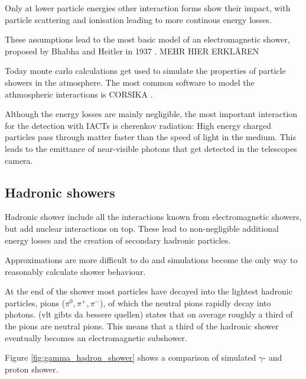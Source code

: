 Only at lower particle energies other interaction forms show their impact,
with particle scattering and ionisation 
leading to more continous energy losses.

These assumptions lead to the most basic model of an 
electromagnetic shower, proposed by Bhabha and Heitler in 1937
\cite{doi:10.1098/rspa.1937.0082}.
MEHR HIER ERKLÄREN


Today monte carlo calculations get used to simulate the properties 
of particle showers in the atmosphere.
The most common software to model the athmospheric interactions is
CORSIKA \cite{Engel:2018akg}.

Although the energy losses are mainly negligible, 
the most important interaction for the detection with IACTs is 
cherenkov radiation: High energy charged particles pass through 
matter faster than the speed of light in the medium. This leads
to the emittance of near-visible photons that get detected 
in the telescopes camera. 


\subsection{Hadronic showers}
Hadronic shower include all the interactions known from 
electromagnetic showers, but add nuclear interactions on top.
These lead to non-negligible additional energy losses 
and the creation of secondary hadronic particles.

Approximations are more difficult to do and simulations 
become the only way to reasonably calculate shower behaviour.

At the end of the shower most particles have decayed into the 
lightest hadronic particles, pions ($\pi^0, \pi^+, \pi^-$), of which the neutral pions 
rapidly decay into photons.
\cite{bookap} (vlt gibts da bessere quellen) states that on average
roughly a third of the pions are neutral pions. This means that 
a third of the hadronic shower eventually becomes an electromagnetic
subshower.

Figure \ref{fig:gamma_hadron_shower} shows a comparison of simulated 
$\gamma$- and proton shower.


